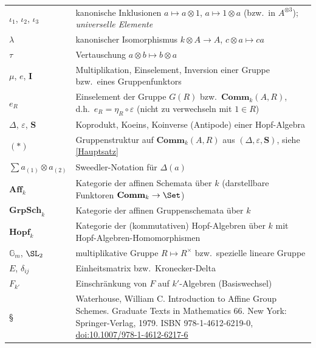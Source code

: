 \documentclass[11pt]{article}
\newcommand{\Comm}{\mathbf{Comm}}
\newcommand{\Aff}{\mathbf{Aff}}
\newcommand{\Sbold}{\mathbf{S}}
\newcommand{\Ibold}{\mathbf{I}}
\newcommand{\GrpSch}{\mathbf{GrpSch}}
\newcommand{\Hopf}{\mathbf{Hopf}}
\begin{document}
\begin{table}[H]
\begin{tabularx}{\textwidth}{>{\raggedleft\arraybackslash}p{2.5cm}||X}
        $\iota_1$, $\iota_2$, $\iota_3$ & kanonische Inklusionen $a\mapsto a\otimes 1$, $a\mapsto 1\otimes a$ (bzw.\ in $A^{\otimes 3}$); \emph{universelle Elemente} \\
        $\lambda$ & kanonischer Isomorphismus $k\otimes A\to A$, $c\otimes a\mapsto ca$ \\
        $\tau$ & Vertauschung $a\otimes b\mapsto b\otimes a$ \\
        $\mu$, $e$, $\Ibold$ & Multiplikation, Einselement, Inversion einer Gruppe bzw.\ eines Gruppenfunktors \\
        $e_R$ & Einselement der Gruppe $G(R)$ bzw.\ $\Comm_k(A,R)$, d.h.\ $e_R=\eta_R\circ\varepsilon$ (nicht zu verwechseln mit $1\in R$) \\
        $\Delta$, $\varepsilon$, $\Sbold$ & Koprodukt, Koeins, Koinverse (Antipode) einer Hopf-Algebra \\
        $(*)$ & Gruppenstruktur auf $\Comm_k(A,R)$ aus $(\Delta,\varepsilon,\Sbold)$, siehe \ref{Hauptsatz} \\
        $\sum a_{(1)}\otimes a_{(2)}$ & Sweedler-Notation für $\Delta(a)$ \\
        $\Aff_k$ & Kategorie der affinen Schemata über $k$ (darstellbare Funktoren $\Comm_k\to\Set$) \\
        $\GrpSch_k$ & Kategorie der affinen Gruppenschemata über $k$ \\
        $\Hopf_k$ & Kategorie der (kommutativen) Hopf-Algebren über $k$ mit Hopf-Algebren-Homomorphismen \\
        $\mathbb{G}_m$, $\SL_2$ & multiplikative Gruppe $R\mapsto R^\times$ bzw.\ spezielle lineare Gruppe \\
        $E$, $\delta_{ij}$ & Einheitsmatrix bzw.\ Kronecker-Delta \\
        $F_{k'}$ & Einschränkung von $F$ auf $k'$-Algebren (Basiswechsel) \\
        § \label{book} & Waterhouse, William C. Introduction to Affine Group Schemes. Graduate Texts in Mathematics 66. New York: Springer-Verlag, 1979. ISBN 978-1-4612-6219-0, \href{https://doi.org/10.1007/978-1-4612-6217-6}{doi:10.1007/978-1-4612-6217-6} \\
 \end{tabularx}
\end{table}
\end{document}
